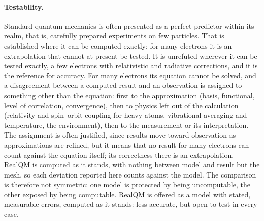 \documentclass[11pt]{article}
\begin{document}
\paragraph{Testability.} Standard quantum mechanics is often presented as a perfect predictor within its realm, that is, carefully prepared experiments on few particles.
That is established where it can be computed exactly; for many electrons it is an extrapolation that cannot at
present be tested. It is unrefuted wherever it can be tested exactly, a few
electrons with relativistic and radiative corrections, and it is the reference for accuracy. For many electrons
its equation cannot be solved, and a disagreement between a computed result and an observation is assigned to
something other than the equation: first to the approximation (basis, functional, level of correlation,
convergence), then to physics left out of the calculation (relativity and spin--orbit coupling for heavy atoms,
vibrational averaging and temperature, the environment), then to the measurement or its interpretation. The
assignment is often justified, since results move toward observation as approximations are refined, but it
means that no result for many electrons can count against the equation itself; its correctness there is an
extrapolation. RealQM is computed as it stands, with nothing between model and result but the mesh, so each
deviation reported here counts against the model. The comparison is therefore not symmetric: one model is
protected by being uncomputable, the other exposed by being computable. RealQM is offered as a model with stated,
measurable errors, computed as it stands: less accurate, but open to test in every case.
\end{document}
